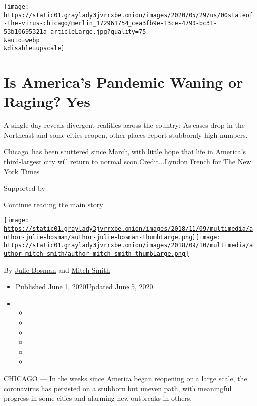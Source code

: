 \texttt{[image: https://static01.graylady3jvrrxbe.onion/images/2020/05/29/us/00stateof-the-virus-chicago/merlin\_172961754\_cea3fb9e-13ce-4790-bc31-53b10695321a-articleLarge.jpg?quality=75\\\&auto=webp\\\&disable=upscale]}

\hypertarget{is-americas-pandemic-waning-or-raging-yes}{%
\section{Is America's Pandemic Waning or Raging?
Yes}\label{is-americas-pandemic-waning-or-raging-yes}}

A single day reveals divergent realities across the country: As cases
drop in the Northeast and some cities reopen, other places report
stubbornly high numbers.

Chicago~has been shuttered since March, with little hope that life in
America's third-largest city will return to normal soon.Credit...Lyndon
French for The New York Times

Supported by

\protect\hyperlink{after-sponsor}{Continue reading the main story}

\href{https://www.nytimes3xbfgragh.onion/by/julie-bosman}{\texttt{[image: https://static01.graylady3jvrrxbe.onion/images/2018/11/09/multimedia/author-julie-bosman/author-julie-bosman-thumbLarge.png]}}\href{https://www.nytimes3xbfgragh.onion/by/mitch-smith}{\texttt{[image: https://static01.graylady3jvrrxbe.onion/images/2018/09/10/multimedia/author-mitch-smith/author-mitch-smith-thumbLarge.png]}}

By \href{https://www.nytimes3xbfgragh.onion/by/julie-bosman}{Julie
Bosman} and
\href{https://www.nytimes3xbfgragh.onion/by/mitch-smith}{Mitch Smith}

\begin{itemize}
\item
  Published June 1, 2020Updated June 5, 2020
\item
  \begin{itemize}
  \item
  \item
  \item
  \item
  \item
  \item
  \end{itemize}
\end{itemize}

CHICAGO --- In the weeks since America began reopening on a large scale,
the coronavirus has persisted on a stubborn but uneven path, with
meaningful progress in some cities and alarming new outbreaks in others.

